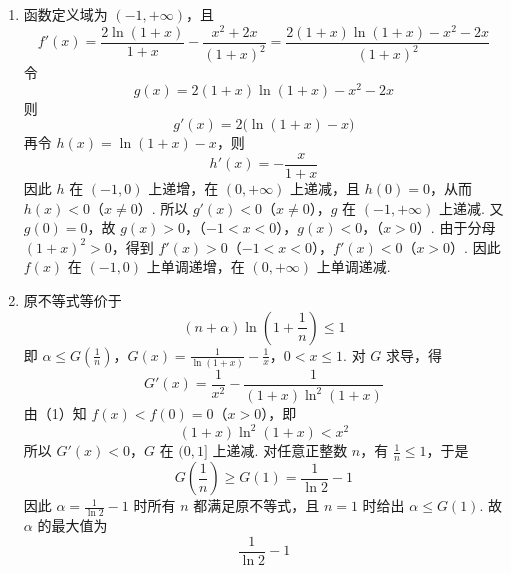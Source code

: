 \begin{solution}
\begin{enumerate}
\item 函数定义域为 \((-1,+\infty)\)，且
\[
f'(x)=\frac{2\ln(1+x)}{1+x}-\frac{x^2+2x}{(1+x)^2}
=\frac{2(1+x)\ln(1+x)-x^2-2x}{(1+x)^2}
\]
令
\[
g(x)=2(1+x)\ln(1+x)-x^2-2x
\]
则
\[
g'(x)=2\bigl(\ln(1+x)-x\bigr)
\]
再令 \(h(x)=\ln(1+x)-x\)，则
\[
h'(x)=-\frac{x}{1+x}
\]
因此 \(h\) 在 \((-1,0)\) 上递增，在 \((0,+\infty)\) 上递减，且 \(h(0)=0\)，从而 \(h(x)<0\)（\(x\ne0\)）. 所以 \(g'(x)<0\)（\(x\ne0\)），\(g\) 在 \((-1,+\infty)\) 上递减. 又 \(g(0)=0\)，故
\(g(x)>0\)，（\(-1<x<0\)），\(g(x)<0\)，（\(x>0\)）.
由于分母 \((1+x)^2>0\)，得到 \(f'(x)>0\)（\(-1<x<0\)），\(f'(x)<0\)（\(x>0\)）. 因此 \(f(x)\) 在 \((-1,0)\) 上单调递增，在 \((0,+\infty)\) 上单调递减.
\item 原不等式等价于
\[
(n+\alpha)\ln\left(1+\frac1n\right)\leqslant1
\]
即
\(\alpha\leqslant G\left(\frac1n\right)\)，\(G(x)=\frac1{\ln(1+x)}-\frac1x\)，\(0<x\leqslant1\).
对 \(G\) 求导，得
\[
G'(x)=\frac1{x^2}-\frac1{(1+x)\ln^2(1+x)}
\]
由（1）知 \(f(x)<f(0)=0\)（\(x>0\)），即
\[
(1+x)\ln^2(1+x)<x^2
\]
所以 \(G'(x)<0\)，\(G\) 在 \((0,1]\) 上递减. 对任意正整数 \(n\)，有 \(\frac1n\leqslant1\)，于是
\[
G\left(\frac1n\right)\geqslant G(1)=\frac1{\ln2}-1
\]
因此 \(\alpha=\frac1{\ln2}-1\) 时所有 \(n\) 都满足原不等式，且 \(n=1\) 时给出 \(\alpha\leqslant G(1)\). 故 \(\alpha\) 的最大值为
\[
\frac1{\ln2}-1
\]
\end{enumerate}
\end{solution}
